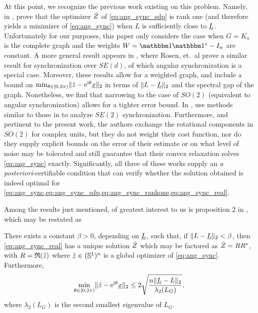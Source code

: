 
At this point, we recognize the previous work existing on this problem.  Namely, in \cite{bandeira2016tightness}, \citeauthor*{bandeira2016tightness} prove that the optimizer $\hat{Z}$ of \eqref{eq:ang_sync_sdp} is rank one (and therefore yields a minimizer of \eqref{eq:ang_sync}) when $L$ is sufficiently close to $\underline{L}$.  Unfortunately for our purposes, this paper only considers the case when $G = K_n$ is the complete graph and the weights $W = \one \one^* - I_n$ are constant.  A more general result appears in \cite{bandeira2016se_sync}, where Rosen, et.~al prove a similar result for synchronization over $SE(d)$, of which angular synchronization is a special case.  Moreover, these results allow for a weighted graph, and include a bound on $\min_{\theta \in [0, 2\pi)} \lVert \hat{z} - \mathrm{e}^{\mathrm{i}\theta} \underline{x}\rVert_2$ in terms of $\lVert L - \underline{L} \rVert_2$ and the spectral gap of the graph.  Nonetheless, we find that narrowing to the case of $SO(2)$ (equivalent to angular synchronization) allows for a tighter error bound.  In \cite{calafiore2016complex_pgo}, \citeauthor*{calafiore2016complex_pgo} use methods similar to those in \cite{bandeira2016se_sync} to analyze $SE(2)$ synchronization.  Furthermore, and pertinent to the present work, the authors exchange the rotational components in $SO(2)$ for complex units, but they do not weight their cost function, nor do they supply explicit bounds on the error of their estimate or on what level of noise may be tolerated and still guarantee that their convex relaxation solves \eqref{eq:ang_sync} exactly.  Significantly, all three of these works supply an \emph{a posteriori}-certifiable condition that can verify whether the solution obtained is indeed optimal for \cref{eq:ang_sync,eq:ang_sync_sdp,eq:ang_sync_rankone,eq:ang_sync_real}.

Among the results just mentioned, of greatest interest to us is proposition 2 in \cite{bandeira2016se_sync}, which may be restated as

\begin{proposition}
  There exists a constant $\beta > 0$, depending on $\underline{L}$, such that, if $\lVert L - \underline{L} \rVert_2 < \beta$, then \eqref{eq:ang_sync_real} has a unique solution $\hat{Z}$ which may be factored as $\hat{Z} = R R^*$, with $R = \mathfrak{R}(\hat{z})$ where $\hat{z} \in (\mathbb{S}^1)^n$ is a global optimizer of \eqref{eq:ang_sync}.  Furthermore, \[\min_{\theta \in [0, 2\pi)} \lVert \hat{z} - \mathrm{e}^{\mathrm{i} \theta} \underline{x} \rVert_2 \le 2 \sqrt{\dfrac{n \lVert \underline{L} - L \rVert_2}{\lambda_2(L_G)}},\] where $\lambda_2(L_G)$ is the second smallest eigenvalue of $L_G$.
\end{proposition}

